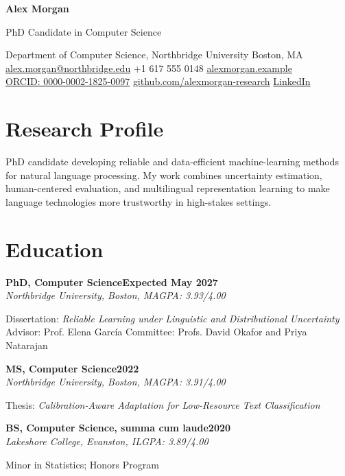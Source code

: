 \documentclass[10pt,letterpaper]{article}
\newcommand{\cventry}[4]{%
  \textbf{#1}\hfill\textbf{#2}\\[-1pt]
  \textit{#3}\hfill\textit{#4}\par
}
\begin{document}
\begin{center}
  {\fontsize{25}{29}\selectfont\bfseries\color{accent}Alex Morgan}\par
  \vspace{2pt}
  {\large PhD Candidate in Computer Science}\par
  \vspace{5pt}
  Department of Computer Science, Northbridge University \textbar{} Boston, MA\\[2pt]
  \href{mailto:alex.morgan@northbridge.edu}{alex.morgan@northbridge.edu}
  \enspace\textbar\enspace +1 617 555 0148
  \enspace\textbar\enspace \href{https://alexmorgan.example}{alexmorgan.example}\\[1pt]
  \href{https://orcid.org/0000-0002-1825-0097}{ORCID: 0000-0002-1825-0097}
  \enspace\textbar\enspace
  \href{https://github.com/alexmorgan-research}{github.com/alexmorgan-research}
  \enspace\textbar\enspace
  \href{https://www.linkedin.com/in/alexmorgan-research}{LinkedIn}
\end{center}

\section*{Research Profile}
PhD candidate developing reliable and data-efficient machine-learning methods for natural language
processing. My work combines uncertainty estimation, human-centered evaluation, and multilingual
representation learning to make language technologies more trustworthy in high-stakes settings.

\section*{Education}
\cventry{PhD, Computer Science}{Expected May 2027}{Northbridge University, Boston, MA}{GPA: 3.93/4.00}
Dissertation: \textit{Reliable Learning under Linguistic and Distributional Uncertainty}\\[-1pt]
Advisor: Prof. Elena García \quad Committee: Profs. David Okafor and Priya Natarajan

\vspace{4pt}
\cventry{MS, Computer Science}{2022}{Northbridge University, Boston, MA}{GPA: 3.91/4.00}
Thesis: \textit{Calibration-Aware Adaptation for Low-Resource Text Classification}

\vspace{4pt}
\cventry{BS, Computer Science, summa cum laude}{2020}{Lakeshore College, Evanston, IL}{GPA: 3.89/4.00}
Minor in Statistics; Honors Program
\end{document}
